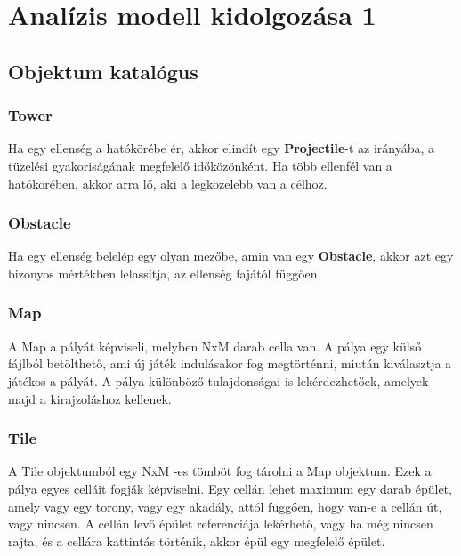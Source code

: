 %
\chapter{Analízis modell kidolgozása 1}

\thispagestyle{fancy}

\section{Objektum katalógus}


\subsection{Tower}
Ha egy ellenség a hatókörébe ér, akkor elindít egy \textbf{Projectile}-t az irányába, a tüzelési gyakoriságának megfelelő időközönként. Ha több ellenfél van a hatókörében, akkor arra lő, aki a legközelebb van a célhoz.

\subsection{Obstacle}
Ha egy ellenség belelép egy olyan mezőbe, amin van egy \textbf{Obstacle}, akkor azt egy bizonyos mértékben lelassítja, az ellenség fajától függően.

\subsection{Map}
A Map a pályát képviseli, melyben NxM darab cella van. A pálya egy külső fájlból betölthető, ami új játék indulásakor fog megtörténni, miután kiválasztja a játékos a pályát. A pálya különböző tulajdonságai is lekérdezhetőek, amelyek majd a kirajzoláshoz kellenek.

\subsection{Tile}
A Tile objektumból egy NxM -es tömböt fog tárolni a Map objektum. Ezek a pálya egyes celláit fogják képviselni. Egy cellán lehet maximum egy darab épület, amely vagy egy torony, vagy egy akadály, attól függően, hogy van-e a cellán út, vagy nincsen. A cellán levő épület referenciája lekérhető, vagy ha még nincsen rajta, és a cellára kattintás történik, akkor épül egy megfelelő épület.


